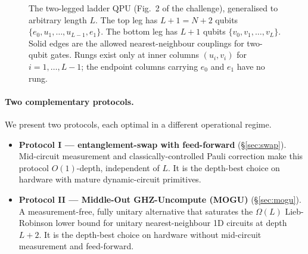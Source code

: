 \documentclass[11pt,a4paper]{article}
\theoremstyle{definition}
\begin{document}
\begin{figure}[h]
\centering
{}
\caption{The two-legged ladder QPU (Fig.~2 of the challenge), generalised
  to arbitrary length $L$. The top leg has $L+1=N+2$ qubits
  $\{e_0,u_1,\dots,u_{L-1},e_1\}$. The bottom leg has $L+1$ qubits
  $\{v_0,v_1,\dots,v_L\}$. Solid edges are the allowed nearest-neighbour
  couplings for two-qubit gates. Rungs exist only at inner columns
  $(u_i,v_i)$ for $i=1,\dots,L-1$; the endpoint columns carrying
  $e_0$ and $e_1$ have no rung.}
\label{fig:ladder}
\end{figure}

\paragraph{Two complementary protocols.} We present two protocols, each
optimal in a different operational regime.

\begin{itemize}
\item \textbf{Protocol I — entanglement-swap with feed-forward}
  (\S\ref{sec:swap}). Mid-circuit measurement and classically-controlled
  Pauli correction make this protocol $O(1)$-depth, independent of $L$.
  It is the depth-best choice on hardware with mature dynamic-circuit
  primitives.
\item \textbf{Protocol II — Middle-Out GHZ-Uncompute (MOGU)}
  (\S\ref{sec:mogu}). A measurement-free, fully unitary alternative that
  saturates the $\Omega(L)$ Lieb-Robinson lower bound for unitary
  nearest-neighbour 1D circuits at depth $L+2$. It is the depth-best
  choice on hardware without mid-circuit measurement and feed-forward.
\end{itemize}
\end{document}
